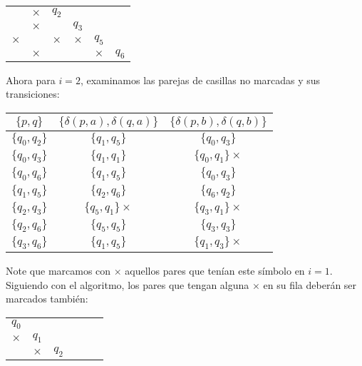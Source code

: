 \begin{itemize}
\begin{center}
\begin{tabular}{ cccccc}
        \multicolumn{1}{|c|}{} &\multicolumn{1}{|c|}{$\times$} &$q_2$ & & & \\ \cline{1-3}
        \multicolumn{1}{|c|}{} &\multicolumn{1}{|c|}{$\times$} &\multicolumn{1}{|c|}{} &$q_3$ & & \\ \cline{1-4}
        \multicolumn{1}{|c|}{$\times$} &\multicolumn{1}{|c|}{} &\multicolumn{1}{|c|}{$\times$} &\multicolumn{1}{|c|}{$\times$} &$q_5$ & \\ \cline{1-5}
        \multicolumn{1}{|c|}{} &\multicolumn{1}{|c|}{$\times$} &\multicolumn{1}{|c|}{} &\multicolumn{1}{|c|}{} &\multicolumn{1}{|c|}{$\times$} &$q_6$ \\ \cline{1-5}
    \end{tabular}
    \end{center}
    Ahora para $i=2$, examinamos las parejas de casillas no marcadas y sus transiciones:
    \begin{center}
        \begin{tabular}{c||c|c}
        $\{p,q\}$ & $\{\delta(p,a),\delta(q,a)\}$ & $\{\delta(p,b),\delta(q,b)\}$ \\ \hline
        $\{q_0,q_2\}$ & $\{q_1,q_5\}$ & $\{q_0,q_3\}$ \\ \hline
        $\{q_0,q_3\}$ & $\{q_1,q_1\}$ & $\{q_0,q_1\}\times$ \\ \hline
        $\{q_0,q_6\}$ & $\{q_1,q_5\}$ & $\{q_0,q_3\}$ \\ \hline
        $\{q_1,q_5\}$ & $\{q_2,q_6\}$ & $\{q_6,q_2\}$ \\ \hline
        $\{q_2,q_3\}$ & $\{q_5,q_1\}\times$ & $\{q_3,q_1\}\times$ \\ \hline
        $\{q_2,q_6\}$ & $\{q_5,q_5\}$  & $\{q_3,q_3\}$ \\ \hline
        $\{q_3,q_6\}$ & $\{q_1,q_5\}$ & $\{q_1,q_3\}\times$ \\ \hline   
        \end{tabular}
    \end{center}
    Note que marcamos con $\times$ aquellos pares que tenían este símbolo en $i=1.$ Siguiendo con el algoritmo, los pares que tengan alguna $\times$ en su fila deberán ser marcados también:
    \begin{center}
        \begin{tabular}{ cccccc}
        $q_0$& & & & & \\ \cline{1-1}
        \multicolumn{1}{|c|}{$\times$} &$q_1$ & & & & \\ \cline{1-2}
        \multicolumn{1}{|c|}{} &\multicolumn{1}{|c|}{$\times$} &$q_2$ & & & \\ \cline{1-3}

\end{tabular}
\end{center}
\end{itemize}
